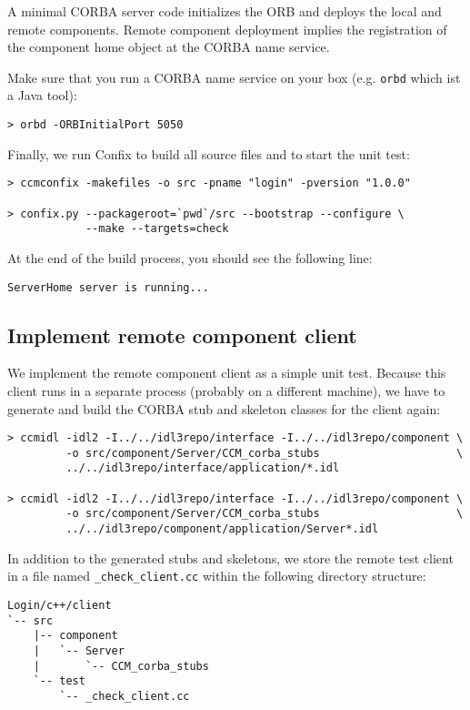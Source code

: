 A minimal CORBA server code initializes the ORB and deploys the local and
remote components. Remote component deployment implies the registration of the
component home object at the CORBA name service. 

\vspace{3mm}
Make sure that you run a CORBA name service on your box (e.g. {\tt orbd} which 
ist a Java tool):
\begin{verbatim}
> orbd -ORBInitialPort 5050
\end{verbatim}


Finally, we run Confix to build all source files and to start the unit test:
\begin{verbatim}
> ccmconfix -makefiles -o src -pname "login" -pversion "1.0.0"

> confix.py --packageroot=`pwd`/src --bootstrap --configure \
            --make --targets=check
\end{verbatim}

At the end of the build process, you should see the following line:
\begin{verbatim}
ServerHome server is running...
\end{verbatim}


\subsection{Implement remote component client}
\label{subsection:ImplementRemoteComponentClient}

We implement the remote component client as a simple unit test.
Because this client runs in a separate process (probably on a different machine), we
have to generate and build the CORBA stub and skeleton classes for the client 
again:

\begin{verbatim}
> ccmidl -idl2 -I../../idl3repo/interface -I../../idl3repo/component \
         -o src/component/Server/CCM_corba_stubs                     \  
         ../../idl3repo/interface/application/*.idl

> ccmidl -idl2 -I../../idl3repo/interface -I../../idl3repo/component \
         -o src/component/Server/CCM_corba_stubs                     \
         ../../idl3repo/component/application/Server*.idl
\end{verbatim}


In addition to the generated stubs and skeletons, we store the remote test
client in a file named {\tt \_check\_client.cc} within the following directory structure:
\begin{verbatim}
Login/c++/client
`-- src
    |-- component
    |   `-- Server
    |       `-- CCM_corba_stubs
    `-- test
        `-- _check_client.cc
\end{verbatim}

